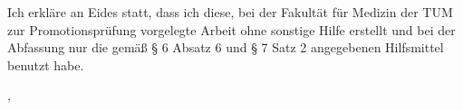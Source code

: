\thispagestyle{empty}
\vspace*{0.8\textheight}
\noindent
Ich erkläre an Eides statt, dass ich diese, bei der Fakultät für Medizin der TUM zur Promotionsprüfung vorgelegte Arbeit ohne sonstige Hilfe erstellt und bei der Abfassung nur die gemäß § 6 Absatz 6 und  § 7 Satz 2 angegebenen Hilfsmittel benutzt habe.

\vspace{20mm}
\noindent
\getSubmissionLocation{}, \getSubmissionDate{} \hspace{4cm} \getAuthor{}

\cleardoublepage{}
